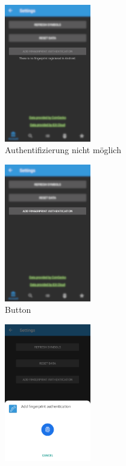 \documentclass[a4paper]{article}
\begin{document}
\begin{figure}[H]
    \begin{subfigure}{.329\textwidth}
        \centering
        \includegraphics[height=6cm,keepaspectratio]{./images/settings/fingerprint_not_registered.png}
        \caption{Authentifizierung nicht möglich}
        \label{fig:functionality:settings:fingerprint:notregistered}
    \end{subfigure}
    \begin{subfigure}{.329\textwidth}
        \centering
        \includegraphics[height=6cm,keepaspectratio]{./images/settings/fingerprint_button.png}
        \caption{Button\linebreak}
        \label{fig:functionality:settings:fingerprint:button}
    \end{subfigure}
    \begin{subfigure}{.329\textwidth}
        \centering
        \includegraphics[height=6cm,keepaspectratio]{./images/settings/fingerprint_add_requested.png}

\end{subfigure}
\end{figure}
\end{document}
